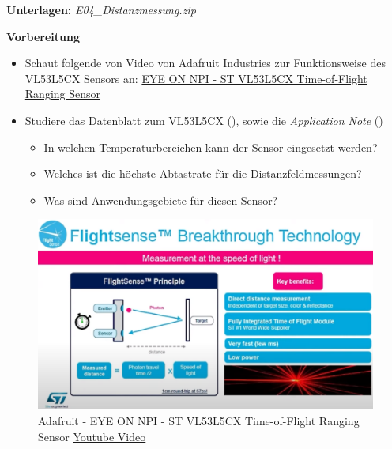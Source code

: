 \documentclass[
  11pt,
  a4paperpaper,
  oneside, openany  ,captions=tableheading
]{scrbook}
\providecommand{\tightlist}{%
  \setlength{\itemsep}{0pt}\setlength{\parskip}{0pt}}
\theoremstyle{definition}
\theoremstyle{remark}
\begin{document}
\textbf{Unterlagen:} \emph{ E04\_Distanzmessung.zip}

\textbf{Vorbereitung}

\begin{itemize}
\tightlist
\item
  Schaut folgende von Video von Adafruit Industries zur Funktionsweise
  des VL53L5CX Sensors an:
  \href{https://www.youtube.com/embed/nf527vcKRSE?si=Q2Wm_pS2O1n99-ha}{EYE
  ON NPI - ST VL53L5CX Time-of-Flight Ranging Sensor}
\item
  Studiere das Datenblatt zum VL53L5CX
  (), sowie die
  \emph{Application Note} ()

  \begin{itemize}
  \tightlist
  \item
    In welchen Temperaturbereichen kann der Sensor eingesetzt werden?
  \item
    Welches ist die höchste Abtastrate für die Distanzfeldmessungen?
  \item
    Was sind Anwendungsgebiete für diesen Sensor?
  \end{itemize}
\end{itemize}

\begin{figure}[H]

{\centering \includegraphics{images/youtube_adafruit_VL53L5CX.png}

}

\caption{Adafruit - EYE ON NPI - ST VL53L5CX Time-of-Flight Ranging
Sensor
\href{https://www.youtube.com/embed/nf527vcKRSE?si=Q2Wm_pS2O1n99-ha}{Youtube
Video}}

\end{figure}%
\end{document}
